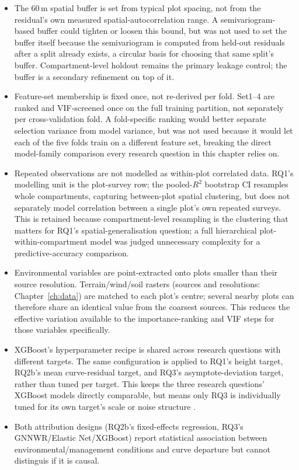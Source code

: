 \begin{itemize}
\setlength\itemsep{2pt}
\item The 60\,m  spatial buffer is set from typical plot spacing, not from the residual's own measured spatial-autocorrelation range. A semivariogram-based buffer could tighten or loosen this bound, but was not used to set the buffer itself because the semivariogram is computed from held-out residuals after a split already exists, a circular basis for choosing that same split's buffer. Compartment-level holdout remains the primary leakage control; the buffer is a secondary refinement on top of it.
\item Feature-set membership is fixed once, not re-derived per fold. Set1--4 are ranked and VIF-screened once on the full training partition, not separately per cross-validation fold. A fold-specific ranking would better separate selection variance from model variance, but was not used because it would let each of the five folds train on a different feature set, breaking the direct model-family comparison every research question in this chapter relies on.
\item Repeated observations are not modelled as within-plot correlated data. RQ1's modelling unit is the plot-survey row; the pooled-$R^2$ bootstrap CI resamples whole compartments, capturing between-plot spatial clustering, but does not separately model correlation between a single plot's own repeated surveys. This is retained because compartment-level resampling is the clustering that matters for RQ1's spatial-generalisation question; a full hierarchical plot-within-compartment model was judged unnecessary complexity for a predictive-accuracy comparison.
\item Environmental variables are point-extracted onto plots smaller than their source resolution. Terrain/wind/soil rasters (sources and resolutions: Chapter~\ref{ch:data}) are matched to each plot's centre; several nearby plots can therefore share an identical value from the coarsest sources. This reduces the effective variation available to the importance-ranking and VIF steps for those variables specifically.
\item XGBoost's hyperparameter recipe is shared across research questions with different targets. The same configuration is applied to RQ1's height target, RQ2b's mean curve-residual target, and RQ3's asymptote-deviation target, rather than tuned per target. This keeps the three research questions' XGBoost models directly comparable, but means only RQ3 is individually tuned for its own target's scale or noise structure .
\item Both attribution designs (RQ2b's fixed-effects regression, RQ3's GNNWR/Elastic Net/XGBoost) report statistical association between environmental/management conditions and curve departure but cannot distinguis if it is causal. 
\end{itemize}

